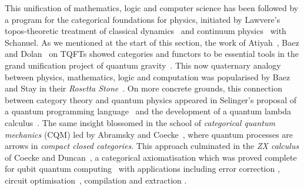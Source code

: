 This unification of mathematics, logic and computer science has been followed by a program for the categorical foundations for physics, initiated by Lawvere's topos-theoretic treatment of classical dynamics~\cite{Lawvere79} and continuum physics~\cite{LawvereSchanuel86} with Schanuel.
As we mentioned at the start of this section, the work of Atiyah~\cite{Atiyah88}, Baez and Dolan~\cite{BaezDolan95} on TQFTs showed categories and functors to be essential tools in the grand unification project of quantum gravity~\cite{Baez06}.
This now quaternary analogy between physics, mathematics, logic and computation was popularised by Baez and Stay in their \emph{Rosetta Stone}~\cite{BaezStay10}.
On more concrete grounds, this connection between category theory and quantum physics appeared in Selinger's proposal of a quantum programming language~\cite{Selinger04} and the development of a quantum lambda calculus~\cite{VanTonder04,SelingerValiron06,SelingerEtAl09}.
The same insight blossomed in the school of \emph{categorical quantum mechanics} (CQM) led by Abramsky and Coecke~\cite{AbramskyCoecke04}, where quantum processes are arrows in \emph{compact closed categories}.
This approach culminated in the \emph{ZX calculus} of Coecke and Duncan~\cite{CoeckeDuncan08,CoeckeDuncan11}, a categorical axiomatisation which was proved complete for qubit quantum computing~\cite{JeandelEtAl18a,HadzihasanovicEtAl18}
with applications including error correction \cite{ChancellorEtAl18,GidneyFowler19}, circuit optimisation~\cite{KissingerVanDeWetering20,DuncanEtAl20,DeBeaudrapEtAl20}, compilation \cite{CowtanEtAl20,DeGriendDuncan20} and extraction \cite{BackensEtAl21}.

